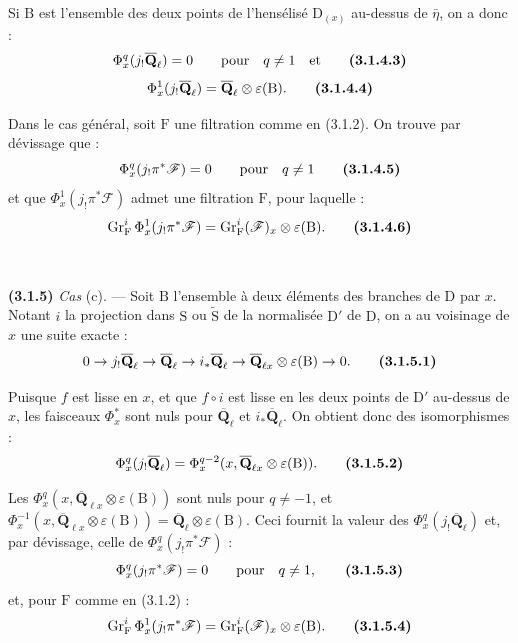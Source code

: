 \documentclass[11pt,leqno]{article}
\newcommand{\Page}[1]{\ifvmode\noindent\else\unskip\ \fi{\footnotesize\textcolor{gray}{[p.\,#1]}}\ \ignorespaces}
\begin{document}
Si \(\mathrm B\) est l’ensemble des deux points de l’hensélisé \(\mathrm D_{(x)}\) au-dessus de \(\bar{\eta}\), on a donc :
\[
\Phi_x^q(j_!\overline{\mathbf Q}_\ell)=0
\qquad\text{pour}\quad q\ne1
\quad\text{et}
\tag*{\textbf{(3.1.4.3)}}
\]
\[
\Phi_x^1(j_!\overline{\mathbf Q}_\ell)
=\overline{\mathbf Q}_\ell\otimes\varepsilon(\mathrm B).
\tag*{\textbf{(3.1.4.4)}}
\]

Dans le cas général, soit \(\mathrm F\) une filtration comme en (3.1.2). On trouve par dévissage que :
\[
\Phi_x^q(j_!\pi^*\mathscr F)=0
\qquad\text{pour}\quad q\ne1
\tag*{\textbf{(3.1.4.5)}}
\]
et que \(\Phi_x^1(j_!\pi^*\mathscr F)\) admet une filtration \(\mathrm F\), pour laquelle :
\[
\operatorname{Gr}_{\mathrm F}^i\Phi_x^1(j_!\pi^*\mathscr F)
=\operatorname{Gr}_{\mathrm F}^i(\mathscr F)_x\otimes\varepsilon(\mathrm B).
\tag*{\textbf{(3.1.4.6)}}
\]

\Page{200}

\textbf{(3.1.5)} \textit{Cas} (c). — Soit \(\mathrm B\) l’ensemble à deux éléments des branches de \(\mathrm D\) par \(x\). Notant \(i\) la projection dans \(\mathrm S\) ou \(\widetilde{\mathrm S}\) de la normalisée \(\mathrm D'\) de \(\mathrm D\), on a au voisinage de \(x\) une suite exacte :
\[
0\to j_!\overline{\mathbf Q}_\ell
\to\overline{\mathbf Q}_\ell
\to i_*\overline{\mathbf Q}_\ell
\to\overline{\mathbf Q}_{\ell x}\otimes\varepsilon(\mathrm B)
\to0.
\tag*{\textbf{(3.1.5.1)}}
\]

Puisque \(f\) est lisse en \(x\), et que \(f\circ i\) est lisse en les deux points de \(\mathrm D'\) au-dessus de \(x\), les faisceaux \(\Phi_x^*\) sont nuls pour \(\overline{\mathbf Q}_\ell\) et \(i_*\overline{\mathbf Q}_\ell\). On obtient donc des isomorphismes :
\[
\Phi_x^q(j_!\overline{\mathbf Q}_\ell)
=\Phi_x^{q-2}(x,\overline{\mathbf Q}_{\ell x}\otimes\varepsilon(\mathrm B)).
\tag*{\textbf{(3.1.5.2)}}
\]

Les \(\Phi_x^q(x,\overline{\mathbf Q}_{\ell x}\otimes\varepsilon(\mathrm B))\) sont nuls pour \(q\ne-1\), et \(\Phi_x^{-1}(x,\overline{\mathbf Q}_{\ell x}\otimes\varepsilon(\mathrm B))=\overline{\mathbf Q}_\ell\otimes\varepsilon(\mathrm B)\). Ceci fournit la valeur des \(\Phi_x^q(j_!\overline{\mathbf Q}_\ell)\) et, par dévissage, celle de \(\Phi_x^q(j_!\pi^*\mathscr F)\) :
\[
\Phi_x^q(j_!\pi^*\mathscr F)=0
\qquad\text{pour}\quad q\ne1,
\tag*{\textbf{(3.1.5.3)}}
\]
et, pour \(\mathrm F\) comme en (3.1.2) :
\[
\operatorname{Gr}_{\mathrm F}^i\Phi_x^1(j_!\pi^*\mathscr F)
=\operatorname{Gr}_{\mathrm F}^i(\mathscr F)_x\otimes\varepsilon(\mathrm B).
\tag*{\textbf{(3.1.5.4)}}
\]
\end{document}
